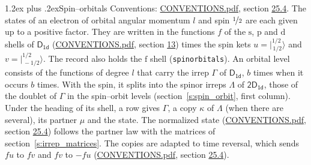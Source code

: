 \documentclass[10pt,a4paper]{article}
\makeatletter
\renewcommand\section{\@startsection{section}{1}{\z@}{-3ex plus -1ex minus -.2ex}%
  {1.2ex plus .2ex}{\normalfont\large\sffamily\bfseries\color{parttitle}}}
\numberwithin{equation}{section}
\newcommand{\grp}[1]{\mathsf{#1}}
\newcommand{\orbital}[1]{\mathrm{#1}}
\newcommand{\mult}{\kappa}
\newcommand{\intx}{\mu}
\newcommand{\jm}[2]{\bigl\lvert{}^{#1}_{\,#2}\bigr\rangle}
\makeatother
\begin{document}
\section{Spin--orbitals}\label{s:spin_orbitals}
Conventions: \href{../../CONVENTIONS.pdf}{CONVENTIONS.pdf}, section \href{../../CONVENTIONS.pdf\#conv.25.4}{25.4}.
\leavevmode\label{n:index.orbital.l}The states of an electron of orbital angular momentum $l$ and spin $\nicefrac{1}{2}$ are each given up to a positive factor. \label{n:local.spinor.uv}\label{n:local.function.f}They are written in the functions $f$ of the $\orbital{s}$, $\orbital{p}$ and $\orbital{d}$ shells of \href{../../../rotation/data/pdf/D1d.pdf}{$\grp{D_{1d}}$} (\href{../../CONVENTIONS.pdf}{CONVENTIONS.pdf}, section \href{../../../rotation/CONVENTIONS.pdf\#conv.13}{13}) times the spin kets $u = \jm{1/2}{1/2}$ and $v = \jm{1/2}{-1/2}$. The record also holds the $\orbital{f}$ shell (\texttt{spinorbitals}). An orbital level consists of the functions of degree $l$ that carry the irrep $\Gamma$ of \href{../../../rotation/data/pdf/D1d.pdf}{$\grp{D_{1d}}$}, $b$ times when it occurs $b$ times. With the spin, it splits into the spinor irreps $\Lambda$ of $\grp{2D_{1d}}$, those of the doublet of $\Gamma$ in the spin--orbit levels (section~\ref{s:spin_orbit}, first column). \label{n:head.state}Under the heading of its shell, a row gives $\Gamma$, a copy $\mult$ of $\Lambda$ (when there are several), its partner $\intx$ and the state. The normalized state (\href{../../CONVENTIONS.pdf}{CONVENTIONS.pdf}, section \href{../../CONVENTIONS.pdf\#conv.25.4}{25.4}) follows the partner law with the matrices of section~\ref{s:irrep_matrices}. The copies are adapted to time reversal, which sends $f u$ to $f v$ and $f v$ to $-f u$ (\href{../../CONVENTIONS.pdf}{CONVENTIONS.pdf}, section \href{../../CONVENTIONS.pdf\#conv.25.4}{25.4}).
\end{document}
